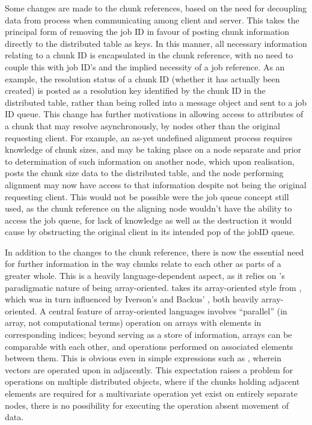 Some changes are made to the chunk references, based on the need for decoupling data from process when communicating among client and server.
This takes the principal form of removing the job ID in favour of posting chunk information directly to the distributed table as keys.
In this manner, all necessary information relating to a chunk ID is encapsulated in the chunk reference, with no need to couple this with job ID's and the implied necessity of a job reference.
As an example, the resolution status of a chunk ID (whether it has actually been created) is posted as a resolution key identified by the chunk ID in the distributed table, rather than being rolled into a message object and sent to a job ID queue.
This change has further motivations in allowing access to attributes of a chunk that may resolve asynchronously, by nodes other than the original requesting client.
For example, an as-yet undefined alignment process requires knowledge of chunk sizes, and may be taking place on a node separate and prior to determination of such information on another node, which upon realisation, posts the chunk size data to the distributed table, and the node performing alignment may now have access to that information despite not being the original requesting client.
This would not be possible were the job queue concept still used, as the chunk reference on the aligning node wouldn't have the ability to access the job queue, for lack of knowledge as well as the destruction it would cause by obstructing the original client in its intended pop of the jobID queue.

In addition to the changes to the chunk reference, there is now the essential need for further information in the way chunks relate to each other as parts of a greater whole.
This is a heavily language-dependent aspect, as it relies on \R{}'s paradigmatic nature of being array-oriented.
\R{} takes its array-oriented style from , which was in turn influenced by
Iverson's  and Backus' , both heavily
array-oriented\cites{becker1994shistory,iverson2007notation}.
A central feature of array-oriented languages involves ``parallel'' (in array, not computational terms) operation on arrays with elements in corresponding indices; beyond serving as a store of information, arrays can be comparable with each other, and operations performed on associated elements between them.
This is obvious even in simple expressions such as , wherein vectors are operated upon in adjacently.
This expectation raises a problem for operations on multiple distributed objects, where if the chunks holding adjacent elements are required for a multivariate operation yet exist on entirely separate nodes, there is no possibility for executing the operation absent movement of data.

